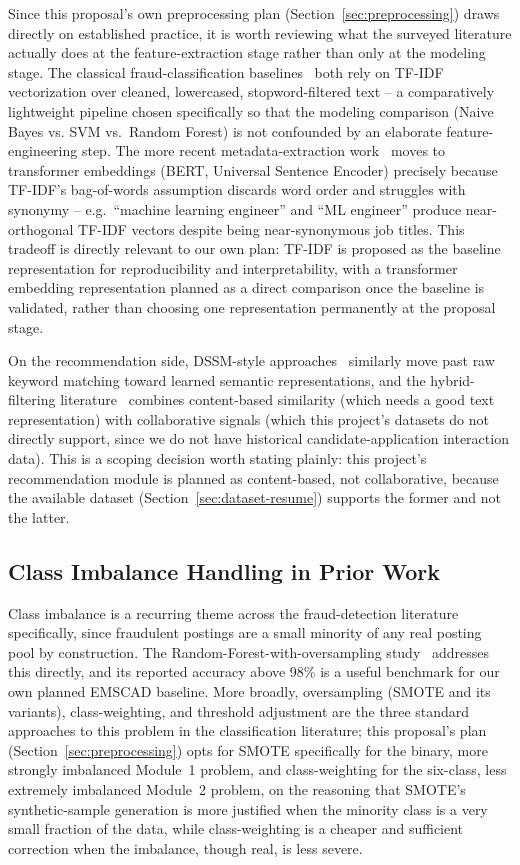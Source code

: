 \documentclass[11pt,a4paper]{article}
\begin{document}
Since this proposal's own preprocessing plan (Section~\ref{sec:preprocessing}) draws
directly on established practice, it is worth reviewing what the surveyed literature
actually does at the feature-extraction stage rather than only at the modeling stage.
The classical fraud-classification baselines~\cite{nasser2020,ijraset2021} both rely on
TF-IDF vectorization over cleaned, lowercased, stopword-filtered text -- a comparatively
lightweight pipeline chosen specifically so that the modeling comparison (Naive Bayes vs.
SVM vs.\ Random Forest) is not confounded by an elaborate feature-engineering step. The
more recent metadata-extraction work~\cite{metadata2023} moves to transformer embeddings
(BERT, Universal Sentence Encoder) precisely because TF-IDF's bag-of-words assumption
discards word order and struggles with synonymy -- e.g.\ ``machine learning engineer''
and ``ML engineer'' produce near-orthogonal TF-IDF vectors despite being near-synonymous
job titles. This tradeoff is directly relevant to our own plan: TF-IDF is proposed as the
baseline representation for reproducibility and interpretability, with a transformer
embedding representation planned as a direct comparison once the baseline is validated,
rather than choosing one representation permanently at the proposal stage.

On the recommendation side, DSSM-style approaches~\cite{mishra2022} similarly move past
raw keyword matching toward learned semantic representations, and the hybrid-filtering
literature~\cite{hybrid} combines content-based similarity (which needs a good text
representation) with collaborative signals (which this project's datasets do not
directly support, since we do not have historical candidate-application interaction
data). This is a scoping decision worth stating plainly: this project's recommendation
module is planned as content-based, not collaborative, because the available dataset
(Section~\ref{sec:dataset-resume}) supports the former and not the latter.

\subsection{Class Imbalance Handling in Prior Work}
\label{sec:lit-imbalance}

Class imbalance is a recurring theme across the fraud-detection literature specifically,
since fraudulent postings are a small minority of any real posting pool by construction.
The Random-Forest-with-oversampling study~\cite{ijraset2021} addresses this directly, and
its reported accuracy above 98\% is a useful benchmark for our own planned EMSCAD
baseline. More broadly, oversampling (SMOTE and its variants), class-weighting, and
threshold adjustment are the three standard approaches to this problem in the
classification literature; this proposal's plan (Section~\ref{sec:preprocessing}) opts
for SMOTE specifically for the binary, more strongly imbalanced Module~1 problem, and
class-weighting for the six-class, less extremely imbalanced Module~2 problem, on the
reasoning that SMOTE's synthetic-sample generation is more justified when the minority
class is a very small fraction of the data, while class-weighting is a cheaper and
sufficient correction when the imbalance, though real, is less severe.
\end{document}
